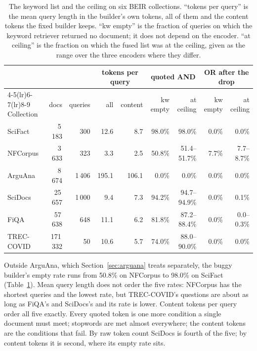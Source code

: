 \documentclass[11pt]{article}
\begin{document}
\begin{table}[h]
\centering
\small
\setlength{\tabcolsep}{4pt}
\begin{tabular}{lrrrrrrrr}
\toprule
 & & & \multicolumn{2}{c}{tokens per query} & \multicolumn{2}{c}{quoted AND} & \multicolumn{2}{c}{OR after the drop} \\
\cmidrule(lr){4-5}\cmidrule(lr){6-7}\cmidrule(lr){8-9}
Collection & docs & queries & all & content & kw empty & at ceiling & kw empty & at ceiling \\
\midrule
SciFact & 5\,183 & 300 & 12.6 & 8.7 & 98.0\% & 98.0\% & 0.0\% & 0.0\% \\
NFCorpus & 3\,633 & 323 & 3.3 & 2.5 & 50.8\% & 51.4--51.7\% & 7.7\% & 7.7--8.7\% \\
ArguAna & 8\,674 & 1\,406 & 195.1 & 106.1 & 0.0\% & 0.0\% & 0.0\% & 0.0\% \\
SciDocs & 25\,657 & 1\,000 & 9.4 & 7.3 & 94.2\% & 94.7--94.9\% & 0.0\% & 0.1\% \\
FiQA & 57\,638 & 648 & 11.1 & 6.2 & 81.8\% & 87.2--88.4\% & 0.0\% & 0.0--0.3\% \\
TREC-COVID & 171\,332 & 50 & 10.6 & 5.7 & 74.0\% & 88.0--90.0\% & 0.0\% & 0.0\% \\
\bottomrule
\end{tabular}
\caption{The keyword list and the ceiling on six BEIR collections. ``tokens per query'' is the mean query length in the builder's own tokens, all of them and the content tokens the fixed builder keeps. ``kw empty'' is the fraction of queries on which the keyword retriever returned no document; it does not depend on the encoder. ``at ceiling'' is the fraction on which the fused list was at the ceiling, given as the range over the three encoders where they differ.}
\label{tab:legs}
\end{table}

Outside ArguAna, which Section~\ref{sec:arguana} treats separately, the buggy builder's empty rate runs from 50.8\% on NFCorpus to 98.0\% on SciFact (Table~\ref{tab:legs}). Mean query length does not order the five rates: NFCorpus has the shortest queries and the lowest rate, but TREC-COVID's questions are about as long as FiQA's and SciDocs's and its rate is lower. Content tokens per query order all five exactly. Every quoted token is one more condition a single document must meet; stopwords are met almost everywhere; the content tokens are the conditions that fail. By raw token count SciDocs is fourth of the five; by content tokens it is second, where its empty rate sits.
\end{document}
